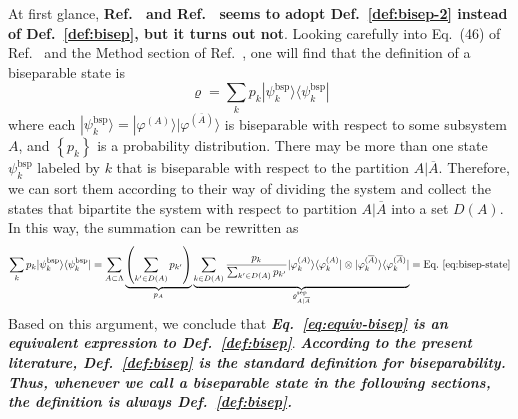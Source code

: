 \documentclass[12font]{article}
\numberwithin{equation}{section}    %
\theoremstyle{definition}
\newtheorem{lemma}[theorem]{Lemma}
\newcommand{\bra}[1]{\langle #1 |}
\newcommand{\ket}[1]{| #1 \rangle}
\newcommand{\lr}[1]{\left(  #1  \right)}
\newcommand{\lrg}[1]{\left\{  #1  \right\}}
\newcommand{\mrm}[1]{\mathrm{#1}}
\begin{document}
At first glance, \textbf{Ref.~\cite{Guhne-Toth_2009} and Ref.~\cite{Lyu-Chandorkar-Kapoor-Takei-Sorensen-Witczak-Krempa_2026} seems to adopt Def.~\ref{def:bisep-2} instead of Def.~\ref{def:bisep}, but it turns out not}. Looking carefully into Eq.~(46) of Ref.~\cite{Guhne-Toth_2009} and the Method section of Ref.~\cite{Lyu-Chandorkar-Kapoor-Takei-Sorensen-Witczak-Krempa_2026}, one will find that the definition of a biseparable state is
\begin{equation}\label{eq:equiv-bisep}
    \varrho = \sum_{k}p_k \ket{\psi^{\mrm{bsp}}_k}\bra{\psi^{\mrm{bsp}}_{k}}
\end{equation}
where each $\ket{\psi^{\mrm{bsp}}_k} = \ket{\varphi^{(A)}} \ket{\varphi^{(\overline{A})}}$ is biseparable with respect to some subsystem $A$, and $\lrg{p_k}$ is a probability distribution. There may be more than one state $\psi^{\mrm{bsp}}_k$ labeled by $k$ that is biseparable with respect to the partition $A|\overline{A}$. Therefore, we can sort them according to their way of dividing the system and collect the states that bipartite the system with respect to partition $A|\overline{A}$ into a set $D(A)$. In this way, the summation can be rewritten as 
\[
\sum_{k}p_k \ket{\psi^{\mrm{bsp}}_k}\bra{\psi^{\mrm{bsp}}_{k}}
=
\sum_{A\subset\Lambda}
\underbrace{\lr{\sum_{k'\in D(A)} p_{k'}}}_{p_{A}}
\underbrace{
\sum_{k\in D(A)} 
\frac{p_{k}}{\sum_{k'\in D(A)} p_{k'}}
\ket{\varphi^{(A)}_k}
\bra{\varphi^{(A)}_k}
\otimes
\ket{\varphi^{(\overline{A})}_k}
\bra{\varphi^{(\overline{A})}_k}
}_{\varrho^{\mrm{sep}}_{A|\overline{A}}} = \text{Eq.~\eqref{eq:bisep-state}}
\]
Based on this argument, we conclude that \textbf{\textit{Eq.~\eqref{eq:equiv-bisep} is an equivalent expression to Def.~\ref{def:bisep}}}. \textbf{\textit{According to the present literature, Def.~\ref{def:bisep} is the standard definition for biseparability. Thus, whenever we call a biseparable state in the following sections, the definition is always Def.~\ref{def:bisep}.}} 

\end{document}
